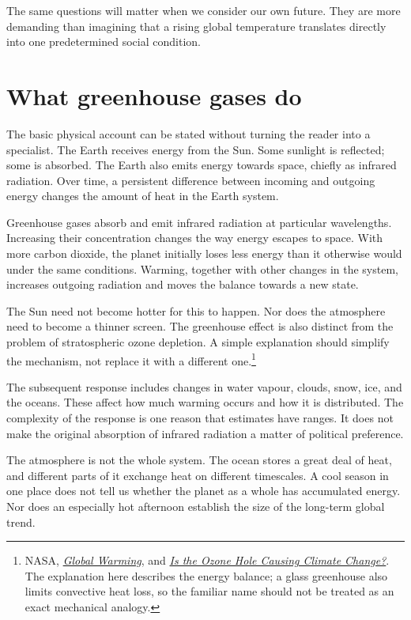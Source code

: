 \documentclass[12pt,a4paper]{book}
\begin{document}
The same questions will matter when we consider our own future. They are more demanding than imagining that a rising global temperature translates directly into one predetermined social condition.

\section*{What greenhouse gases do}

The basic physical account can be stated without turning the reader into a specialist. The Earth receives energy from the Sun. Some sunlight is reflected; some is absorbed. The Earth also emits energy towards space, chiefly as infrared radiation. Over time, a persistent difference between incoming and outgoing energy changes the amount of heat in the Earth system.

Greenhouse gases absorb and emit infrared radiation at particular wavelengths. Increasing their concentration changes the way energy escapes to space. With more carbon dioxide, the planet initially loses less energy than it otherwise would under the same conditions. Warming, together with other changes in the system, increases outgoing radiation and moves the balance towards a new state.

The Sun need not become hotter for this to happen. Nor does the atmosphere need to become a thinner screen. The greenhouse effect is also distinct from the problem of stratospheric ozone depletion. A simple explanation should simplify the mechanism, not replace it with a different one.\footnote{NASA, \href{https://science.nasa.gov/earth/climate-change/global-warming/}{\emph{Global Warming}}, and \href{https://science.nasa.gov/climate-change/faq/is-the-ozone-hole-causing-climate-change/}{\emph{Is the Ozone Hole Causing Climate Change?}}. The explanation here describes the energy balance; a glass greenhouse also limits convective heat loss, so the familiar name should not be treated as an exact mechanical analogy.}

The subsequent response includes changes in water vapour, clouds, snow, ice, and the oceans. These affect how much warming occurs and how it is distributed. The complexity of the response is one reason that estimates have ranges. It does not make the original absorption of infrared radiation a matter of political preference.

The atmosphere is not the whole system. The ocean stores a great deal of heat, and different parts of it exchange heat on different timescales. A cool season in one place does not tell us whether the planet as a whole has accumulated energy. Nor does an especially hot afternoon establish the size of the long-term global trend.
\end{document}
